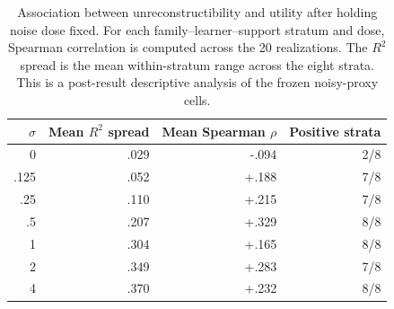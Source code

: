 \begin{table}[tbp]
\caption{Association between unreconstructibility and utility after holding noise dose fixed.
For each family--learner--support stratum and dose, Spearman correlation is computed across the 20 realizations.
The $R^2$ spread is the mean within-stratum range across the eight strata.
This is a post-result descriptive analysis of the frozen noisy-proxy cells.}
\label{tab:app-noisy-proxy-within-dose}
\centering\small
\setlength{\tabcolsep}{6pt}
\begin{tabular}{rrrr}
\toprule
$\sigma$ & Mean $R^2$ spread & Mean Spearman $\rho$ & Positive strata \\
\midrule
0     & .029 & -.094 & 2/8 \\
.125  & .052 & +.188 & 7/8 \\
.25   & .110 & +.215 & 7/8 \\
.5    & .207 & +.329 & 8/8 \\
1     & .304 & +.165 & 8/8 \\
2     & .349 & +.283 & 7/8 \\
4     & .370 & +.232 & 8/8 \\
\bottomrule
\end{tabular}
\end{table}
